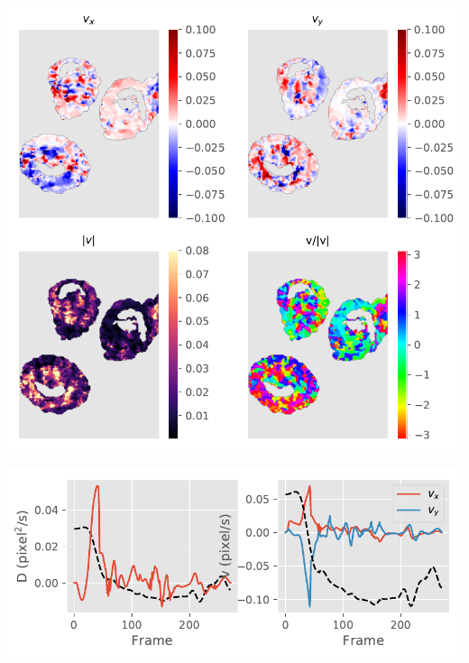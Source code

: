 \documentclass{Dissertate}
\let\origfigure\figure
\let\endorigfigure\endfigure
\renewenvironment{figure}[1][2] {
    \expandafter\origfigure\expandafter[H]
} {
    \endorigfigure
}
\begin{document}
\begin{figure}
\hypertarget{fig:advection}{%
\centering
\includegraphics{source/figures/pdf/advection.pdf}
\caption{Analysis of the velocity fields. The upper rows show
respectively \(v_x\) and \(v_y\), while the lower row shows the
magnitude and angle.}\label{fig:advection}
}
\end{figure}




\begin{figure}
\hypertarget{fig:timepixel}{%
\centering
\includegraphics{source/figures/pdf/general_fit.pdf}
\caption{Diffusion and advection velocities of a single pixel in time.
We have plotted the scaled and translated signal as a black dashed line to
show the correlation.}\label{fig:timepixel}
}
\end{figure}
\end{document}
